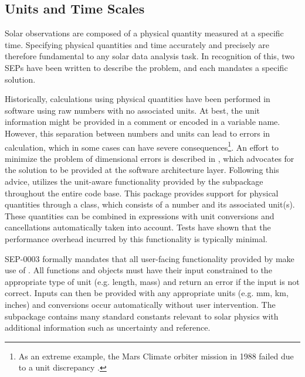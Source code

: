 \subsection{Units and Time Scales}
\label{sec:units}

Solar observations are composed of a physical quantity measured at a specific time.
Specifying physical quantities and time accurately and precisely are therefore fundamental to any solar data analysis task.
In recognition of this, two SEPs have been written to describe the problem, and each mandates a specific solution.

Historically, calculations using physical quantities have been performed in software using raw numbers with no associated units.
At best, the unit information might be provided in a comment or encoded in a variable name.
However, this separation between numbers and units can lead to errors in calculation, which in some cases can have severe consequences\footnote{As an extreme example, the Mars Climate orbiter mission in 1988 failed due to a unit discrepancy \citep{mco_mishap_report}.}.
An effort to minimize the problem of dimensional errors is described in \citet{Damevski2009}, which advocates for the solution to be provided at the software architecture layer.
Following this advice, \sunpypkg utilizes the unit-aware functionality provided by the  subpackage throughout the entire code base.
This package provides support for physical quantities through a  class, which consists of a number and its associated unit(s).
These quantities can be combined in expressions with unit conversions and cancellations automatically taken into account.
Tests have shown that the performance overhead incurred by this functionality is typically minimal.

SEP-0003 \citep{sep-0003} formally mandates that all user-facing functionality provided by \sunpypkg make use of .
All functions and objects must have their input constrained to the appropriate type of unit (e.g. length, mass) and return an error if the input is not correct.
Inputs can then be provided with any appropriate units (e.g. mm, km, inches) and conversions occur automatically without user intervention.
The  subpackage contains many standard constants relevant to solar physics with additional information such as uncertainty and reference.

